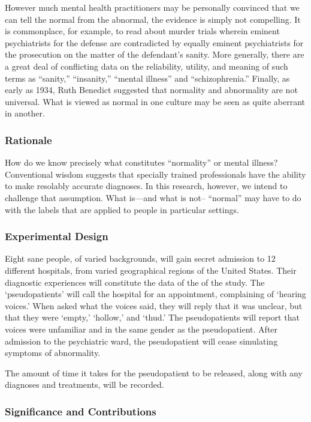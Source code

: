 However much mental health practitioners may be personally convinced that we can tell the normal from the abnormal, the evidence is simply not compelling. It is commonplace, for example, to read about murder trials wherein eminent psychiatrists for the defense are contradicted by equally eminent psychiatrists for the prosecution on the matter of the defendant's sanity. More generally, there are a great deal of conflicting data on the reliability, utility, and meaning of such terms as “sanity,” “insanity,” “mental illness” and “schizophrenia.” Finally, as early as 1934, Ruth Benedict suggested that normality and abnormality are not universal. What is viewed as normal in one culture may be seen as quite aberrant in another.

\subsubsection{Rationale}
\label{rationale}

How do we know precisely what constitutes “normality” or mental illness? Conventional wisdom suggests that specially trained professionals have the ability to make resolably accurate diagnoses. In this research, however, we intend to challenge that assumption. What is—and what is not-- “normal” may have to do with the labels that are applied to people in particular settings.

\subsubsection{Experimental Design}
\label{experimentaldesign}

Eight sane people, of varied backgrounds, will gain secret admission to 12 different hospitals, from varied geographical regions of the United States. Their diagnostic experiences will constitute the data of the of the study. The `pseudopatients' will call the hospital for an appointment, complaining of `hearing voices.' When asked what the voices said, they will reply that it was unclear, but that they were `empty,' `hollow,' and `thud.' The pseudopatients will report that voices were unfamiliar and in the same gender as the pseudopatient. After admission to the psychiatric ward, the pseudopatient will cease simulating symptoms of abnormality. 

The amount of time it takes for the pseudopatient to be released, along with any diagnoses and treatments, will be recorded.

\subsubsection{Significance and Contributions}
\label{significanceandcontributions}

